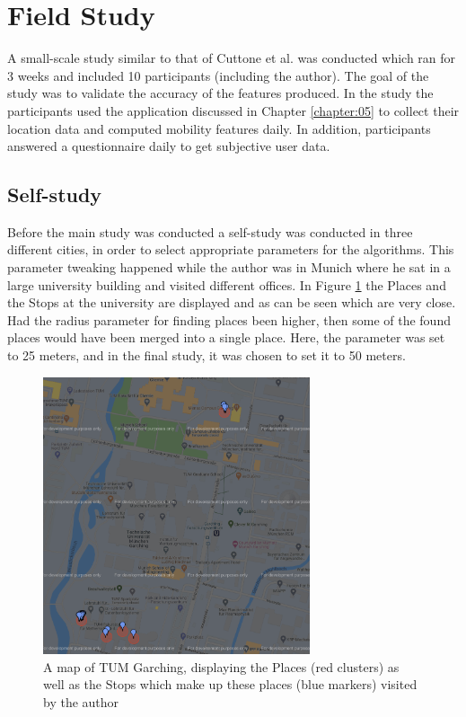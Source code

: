 \section{Field Study}
A small-scale study similar to that of Cuttone et al. \cite{sparse-location-2014} was conducted which ran for 3 weeks and included 10 participants (including the author). The goal of the study was to validate the accuracy of the features produced. In the study the participants used the application discussed in Chapter \ref{chapter:05} to collect their location data and computed mobility features daily. In addition, participants answered a questionnaire daily to get subjective user data. 

\subsection{Self-study}
Before the main study was conducted a self-study was conducted in three different cities, in order to select appropriate parameters for the algorithms. This parameter tweaking happened while the author was in Munich where he sat in a large university building and visited different offices. In Figure \ref{fig:tum-map} the Places and the Stops at the university are displayed and as can be seen which are very close. Had the radius parameter for finding places been higher, then some of the found places would have been merged into a single place. Here, the parameter was set to 25 meters, and in the final study, it was chosen to set it to 50 meters.

\begin{figure}
    \centering
    \includegraphics[width=0.7\textwidth]{images/map/map-tum.png}
    \caption{A map of TUM Garching, displaying the Places (red clusters) as well as the Stops which make up these places (blue markers) visited by the author}
    \label{fig:tum-map}
\end{figure}

